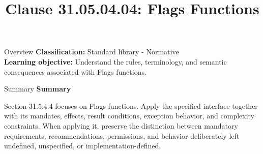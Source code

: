 \documentclass[10pt,letterpaper]{article}
\title{Clause 31.05.04.04: Flags Functions}
\author{}
\date{}
\begin{document}
\maketitle
\begin{CornellOverviewBox}{Overview}
\textbf{Classification:} Standard library - Normative\\[2pt]
\textbf{Learning objective:} Understand the rules, terminology, and semantic consequences associated with Flags functions.
\end{CornellOverviewBox}\begin{CornellSummaryBox}{Summary}
{\sffamily\bfseries\color{Accent} Summary}\par\vspace{3pt}Section 31.5.4.4 focuses on Flags functions. Apply the specified interface together with its mandates, effects, result conditions, exception behavior, and complexity constraints. When applying it, preserve the distinction between mandatory requirements, recommendations, permissions, and behavior deliberately left undefined, unspecified, or implementation-defined.
\end{CornellSummaryBox}
\end{document}
